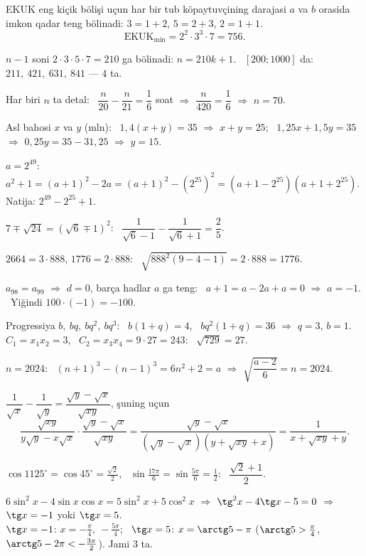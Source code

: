 




EKUK eng kiçik bölişi uçun har bir tub köpaytuvçining darajasi $a$ va $b$ orasida imkon qadar teng bölinadi: $3=1+2$, $5=2+3$, $2=1+1$.
\[\text{EKUK}_{\min}=2^2\cdot3^3\cdot7=756.\]

$n-1$ soni $2\cdot3\cdot5\cdot7=210$ ga bölinadi: $n=210k+1$. \ $[200;1000]$ da: $211,\ 421,\ 631,\ 841$ — $4$ ta.

Har biri $n$ ta detal: \ $\dfrac n{20}-\dfrac n{21}=\dfrac16$ soat $\Rightarrow$ $\dfrac n{420}=\dfrac16$ $\Rightarrow$ $n=70$.

Asl bahosi $x$ va $y$ (mln): \ $1{,}4(x+y)=35$ $\Rightarrow$ $x+y=25$; \ $1{,}25x+1{,}5y=35$ $\Rightarrow$ $0{,}25y=35-31{,}25$ $\Rightarrow$ $y=15$.

$a=2^{49}$: \ $a^2+1=(a+1)^2-2a=(a+1)^2-\left(2^{25}\right)^2=\left(a+1-2^{25}\right)\left(a+1+2^{25}\right)$. Natija: $2^{49}-2^{25}+1$.

$7\mp\sqrt{24}=\left(\sqrt6\mp1\right)^2$: \ $\dfrac1{\sqrt6-1}-\dfrac1{\sqrt6+1}=\dfrac25$.

$2664=3\cdot888$, $1776=2\cdot888$: \ $\sqrt{888^2(9-4-1)}=2\cdot888=1776$.

$a_{98}=a_{99}$ $\Rightarrow$ $d=0$, barça hadlar $a$ ga teng: \ $a+1=a-2a+a=0$ $\Rightarrow$ $a=-1$. \ Yiğindi $100\cdot(-1)=-100$.

Progressiya $b,\ bq,\ bq^2,\ bq^3$: \ $b(1+q)=4$, \ $bq^2(1+q)=36$ $\Rightarrow$ $q=3$, $b=1$.\\
$C_1=x_1x_2=3$, \ $C_2=x_3x_4=9\cdot27=243$: \ $\sqrt{729}=27$.

$n=2024$: \ $(n+1)^3-(n-1)^3=6n^2+2=a$ $\Rightarrow$ $\sqrt{\dfrac{a-2}6}=n=2024$.

$\dfrac1{\sqrt x}-\dfrac1{\sqrt y}=\dfrac{\sqrt y-\sqrt x}{\sqrt{xy}}$, şuning uçun
\[\frac{\sqrt{xy}}{y\sqrt y-x\sqrt x}\cdot\frac{\sqrt y-\sqrt x}{\sqrt{xy}}=\frac{\sqrt y-\sqrt x}{\left(\sqrt y-\sqrt x\right)\left(y+\sqrt{xy}+x\right)}=\frac1{x+\sqrt{xy}+y}.\]

$\cos1125^\circ=\cos45^\circ=\frac{\sqrt2}2$, \ $\sin\frac{17\pi}6=\sin\frac{5\pi}6=\frac12$: \ $\dfrac{\sqrt2+1}2$.

$6\sin^2x-4\sin x\cos x=5\sin^2x+5\cos^2x$ $\Rightarrow$ $\tg^2x-4\tg x-5=0$ $\Rightarrow$ $\tg x=-1$ yoki $\tg x=5$.\\
$\tg x=-1$: $x=-\frac\pi4,\ -\frac{5\pi}4$; \ $\tg x=5$: $x=\arctg5-\pi$ ($\arctg5>\frac\pi4$, $\arctg5-2\pi<-\frac{3\pi}2$). Jami $3$ ta.

